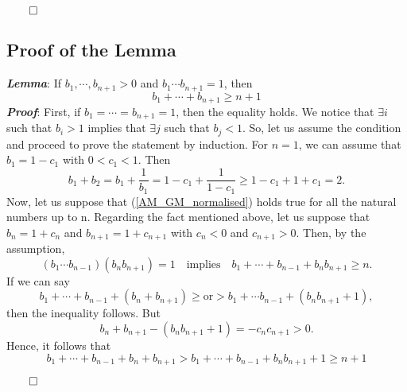 \documentclass{article}
\begin{document}
\begin{right}
$\qed$
\end{right}
\subsection{Proof of the Lemma}
\label{sec-1-3}
\textbf{\emph{Lemma}}:
 If $b_1, \cdots, b_{n+1} >0$ and $b_1 \cdots b_{n+1} = 1$, then
\begin{equation}
\label{AM_GM_normalised}
b_1 + \cdots + b_{n+1} \ge n+1
\end{equation}
\textbf{\emph{Proof}}:
 First, if $b_1 = \cdots = b_{n+1} =1$, then the equality holds.
We notice that $\exists i$ such that $b_{i} > 1$ implies that $\exists j$ such that $b_{j} < 1$.
So, let us assume the condition and proceed to prove the statement by induction. 
For $n=1$, we can assume that $b_1 = 1-c_1$ with $0 < c_1 <1$. Then
\begin{equation*}
\label{ }
b_1 + b_2 = b_1 + \frac{1}{b_1} = 1 - c_1 + \frac{1}{1-c_1} \ge 1-c_1 + 1 + c_1 = 2.
\end{equation*}
Now, let us suppose that (\ref{AM_GM_normalised}) holds true for all the natural numbers up to n. Regarding the fact mentioned above, let us suppose that $b_n = 1 + c_n$ and $b_{n+1} = 1+c_{n+1}$ with $c_n < 0$ and $c_{n+1} > 0$. Then, by the assumption, 
\begin{equation*}
\label{ }
(b_1 \cdots b_{n-1})(b_n b_{n+1}) = 1 \quad \text{implies} \quad b_1 + \cdots + b_{n-1} + b_n b_{n+1} \ge n.
\end{equation*}
If we can say
\begin{equation*}
\label{ }
b_1 + \cdots + b_{n-1} + (b_n + b_{n+1}) \ge \text{or} > b_1 + \cdots b_{n-1} + (b_n b_{n+1} + 1),
\end{equation*}
then the inequality follows. But
\begin{equation*}
\label{ }
b_n + b_{n+1} - (b_n b_{n+1} + 1) = -c_n c_{n+1} > 0.
\end{equation*}
Hence, it follows that 
\begin{equation*}
\label{ }
b_1 + \cdots + b_{n-1} + b_n + b_{n+1} > b_1 + \cdots + b_{n-1} + b_n b_{n+1} + 1 \ge n + 1
\end{equation*}
\begin{right}
$\qed$\\
\end{right}
\end{document}
